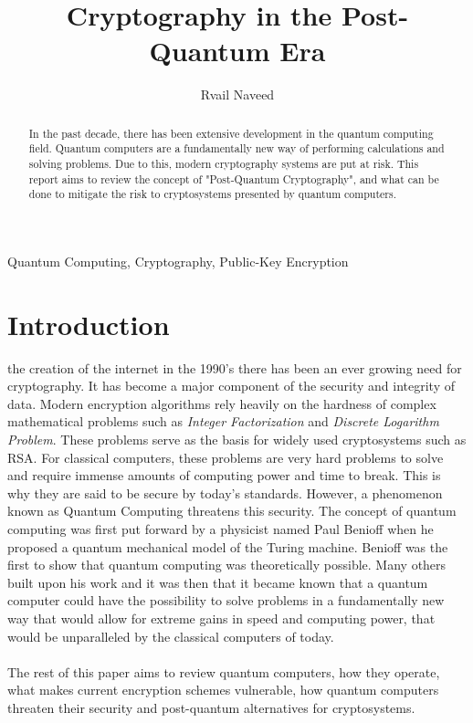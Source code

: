 \documentclass[journal]{IEEEtran}
\begin{document}
\title{Cryptography in the Post-Quantum Era}


\author{Rvail Naveed}

\maketitle


\begin{abstract} %
In the past decade, there has been extensive development in the quantum computing field. 
Quantum computers are a fundamentally new way of performing calculations and solving problems. 
Due to this, modern cryptography systems are put at risk. This report aims to review the concept of "Post-Quantum Cryptography", 
and what can be done to mitigate the risk to cryptosystems presented by quantum computers.  
\end{abstract}

\begin{IEEEkeywords}
Quantum Computing, Cryptography, Public-Key Encryption
\end{IEEEkeywords}


\section{Introduction}

 the creation of the internet in the 1990's there has been an ever growing need for cryptography. 
It has become a major component of the security and integrity of data. Modern encryption algorithms rely heavily on the hardness of complex 
mathematical problems such as \emph{Integer Factorization} and \emph{Discrete Logarithm Problem}. These problems serve as the basis for widely used cryptosystems such as RSA. 
For classical computers, these problems are very hard problems to solve and require immense amounts of computing power and time to break. 
This is why they are said to be secure by today's standards. However, a phenomenon known as Quantum Computing threatens this security. 
The concept of quantum computing was first put forward by a physicist named Paul Benioff when he proposed a quantum mechanical model of the Turing machine. 
Benioff was the first to show that quantum computing was theoretically possible. Many others built upon his work and it was then that it became known that a 
quantum computer could have the possibility to solve problems in a fundamentally new way that would allow for extreme gains in speed and computing power, 
that would be unparalleled by the classical computers of today.
\\ \\
The rest of this paper aims to review quantum computers, how they operate, what makes current encryption schemes vulnerable,
how quantum computers threaten their security and post-quantum alternatives for cryptosystems.
\end{document}
